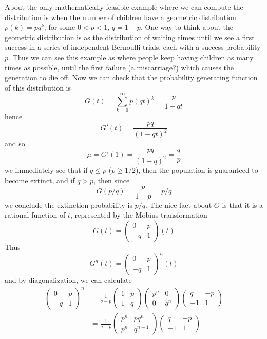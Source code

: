 \begin{example}
    About the only mathematically feasible example where we can compute the distribution is when the number of children have a geometric distribution $\rho(k) = pq^k$, for some $0 < p < 1$, $q = 1 - p$. One way to think about the geometric distribution is as the distribution of waiting times until we see a first success in a series of independent Bernoulli trials, each with a success probability $p$. Thus we can see this example as where people keep having children as many times as possible, until the first failure (a miscarriage?) which causes the generation to die off. Now we can check that the probability generating function of this distribution is
    \[ G(t) = \sum_{k = 0}^\infty p(qt)^k = \frac{p}{1 - qt} \]
    hence
    \[ G'(t) = \frac{pq}{(1 - qt)^2} \]
    and so
    \[ \mu = G'(1) = \frac{pq}{(1 - q)^2} = \frac{q}{p} \]
    we immediately see that if $q \leq p$ ($p \geq 1/2$), then the population is guaranteed to become extinct, and if $q > p$, then since
    \[ G(p/q) = \frac{p}{1 - p} = p/q \]
    we conclude the extinction probability is $p/q$. The nice fact about $G$ is that it is a rational function of $t$, represented by the M\"{o}bius transformation
    \[ G(t) = \begin{pmatrix} 0 & p \\ -q & 1 \end{pmatrix}(t) \]
    Thus
    \[ G^n(t) = \begin{pmatrix} 0 & p \\ -q & 1 \end{pmatrix}^n(t) \]
    and by diagonalization, we can calculate
    \begin{align*}
        \begin{pmatrix} 0 & p \\ -q & 1 \end{pmatrix}^n &= \frac{1}{q - p} \begin{pmatrix} 1 & p \\ 1 & q \end{pmatrix} \begin{pmatrix} p^n & 0 \\ 0 & q^n \end{pmatrix} \begin{pmatrix} q & -p \\ -1 & 1 \end{pmatrix}\\
        &= \frac{1}{q - p} \begin{pmatrix} p^n & pq^n \\ p^n & q^{n+1} \end{pmatrix} \begin{pmatrix} q & -p \\ -1 & 1 \end{pmatrix}\\

\end{align*}
\end{example}
